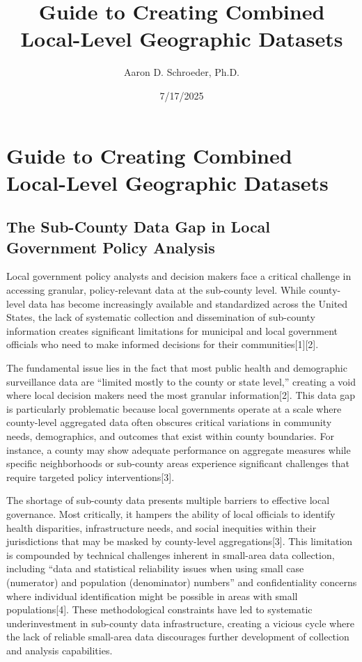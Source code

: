 \documentclass[
  letterpaper,
  DIV=11,
  numbers=noendperiod]{scrartcl}
\title{Guide to Creating Combined Local-Level Geographic Datasets}
\author{Aaron D. Schroeder, Ph.D.}
\date{7/17/2025}
\begin{document}
\maketitle


\section{Guide to Creating Combined Local-Level Geographic
Datasets}\label{guide-to-creating-combined-local-level-geographic-datasets}

\subsection{The Sub-County Data Gap in Local Government Policy
Analysis}\label{the-sub-county-data-gap-in-local-government-policy-analysis}

Local government policy analysts and decision makers face a critical
challenge in accessing granular, policy-relevant data at the sub-county
level. While county-level data has become increasingly available and
standardized across the United States, the lack of systematic collection
and dissemination of sub-county information creates significant
limitations for municipal and local government officials who need to
make informed decisions for their communities{[}1{]}{[}2{]}.

The fundamental issue lies in the fact that most public health and
demographic surveillance data are ``limited mostly to the county or
state level,'' creating a void where local decision makers need the most
granular information{[}2{]}. This data gap is particularly problematic
because local governments operate at a scale where county-level
aggregated data often obscures critical variations in community needs,
demographics, and outcomes that exist within county boundaries. For
instance, a county may show adequate performance on aggregate measures
while specific neighborhoods or sub-county areas experience significant
challenges that require targeted policy interventions{[}3{]}.

The shortage of sub-county data presents multiple barriers to effective
local governance. Most critically, it hampers the ability of local
officials to identify health disparities, infrastructure needs, and
social inequities within their jurisdictions that may be masked by
county-level aggregations{[}3{]}. This limitation is compounded by
technical challenges inherent in small-area data collection, including
``data and statistical reliability issues when using small case
(numerator) and population (denominator) numbers'' and confidentiality
concerns where individual identification might be possible in areas with
small populations{[}4{]}. These methodological constraints have led to
systematic underinvestment in sub-county data infrastructure, creating a
vicious cycle where the lack of reliable small-area data discourages
further development of collection and analysis capabilities.
\end{document}
